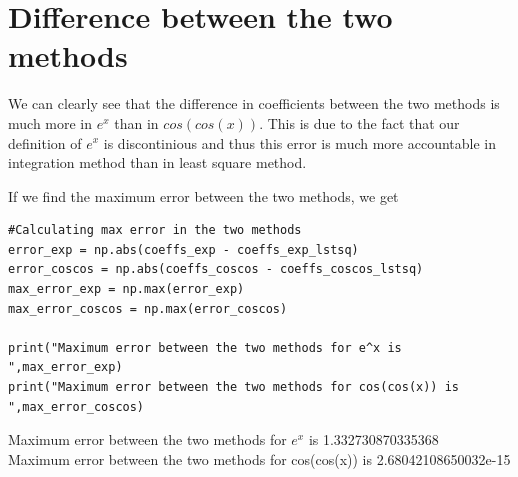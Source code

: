 \documentclass[11pt, a4paper]{article}
\begin{document}
\section{Difference between the two methods}
\par We can clearly see that the difference in coefficients between the two methods is much more in $e^x$ than in $cos(cos(x))$. This is due to the fact that our definition of $e^x$ is discontinious and thus this error is much more accountable in integration method than in least square method.
\par If we find the maximum error between the two methods, we get \\
\begin{lstlisting}
#Calculating max error in the two methods
error_exp = np.abs(coeffs_exp - coeffs_exp_lstsq)
error_coscos = np.abs(coeffs_coscos - coeffs_coscos_lstsq)
max_error_exp = np.max(error_exp)
max_error_coscos = np.max(error_coscos)

print("Maximum error between the two methods for e^x is ",max_error_exp)
print("Maximum error between the two methods for cos(cos(x)) is ",max_error_coscos)
\end{lstlisting}
Maximum error between the two methods for $e^x$ is  1.332730870335368\\
Maximum error between the two methods for cos(cos(x)) is  2.68042108650032e-15\\
\end{document}

